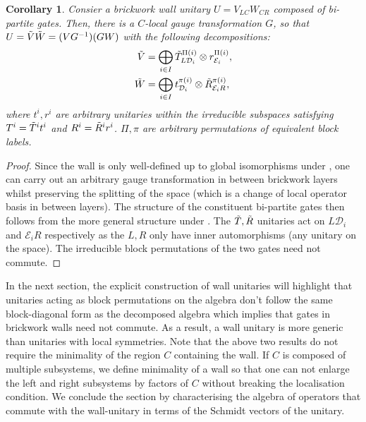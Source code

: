 \documentclass[11pt, twocolumn, floatfix, superscriptaddress, aps, prb, raggedbottom]{revtex4-2}
\newtheorem{corollary}[theorem]{Corollary}
\begin{document}
\begin{corollary}
    Consier a brickwork wall unitary $U = V_{LC}W_{CR}$ composed of bi-partite gates. Then, there is a $C$-local gauge transformation $G$, so that $U = \Tilde{V} \Tilde{W} = (VG^{-1})(GW)$ with the following decompositions: 
    \begin{align}
        \Tilde{V} &= \bigoplus_{i\in I} \tilde T^{\Pi(i)}_{L \mathcal D_{i}} \otimes r^{\Pi(i)}_{\mathcal E_{i}},\\
        \Tilde{W} &= \bigoplus_{i \in I} t^{\pi(i)}_{\mathcal D_{i}} \otimes \tilde R^{\pi(i)}_{\mathcal E_{i} R},
    \end{align} 
    where $t^i, r^i$ are arbitrary unitaries within the irreducible subspaces satisfying $T^i = \Tilde{T}^it^i$ and $R^i = \Tilde{R}^i r^i$. $\Pi, \pi$ are arbitrary permutations of equivalent block labels.
\end{corollary}
\begin{proof}
    Since the wall is only well-defined up to global isomorphisms under , one can carry out an arbitrary gauge transformation in between brickwork layers whilst preserving the splitting of the space (which is a change of local operator basis in between layers). The structure of the constituent bi-partite gates then follows from the more general structure under . The $\Tilde{T}, \Tilde{R}$ unitaries act on $L\mathcal{D}_i$ and $\mathcal{E}_iR$ respectively as the $L, R$ only have inner automorphisms (any unitary on the space). The irreducible block permutations of the two gates need not commute.
\end{proof}

In the next section, the explicit construction of wall unitaries will highlight that unitaries acting as block permutations on the algebra don't follow the same block-diagonal form as the decomposed algebra which implies that gates in brickwork walls 
need not commute. As a result, a wall unitary is more generic than unitaries with local symmetries. Note that the above two results do not require the minimality of the region $C$ containing the wall. If $C$ is composed of multiple subsystems, we define minimality of a wall so that one can not enlarge the left and right subsystems by factors of $C$ without breaking the localisation condition. We conclude the section by characterising the algebra of operators that commute with the wall-unitary in terms of the Schmidt vectors of the unitary. 
\end{document}
